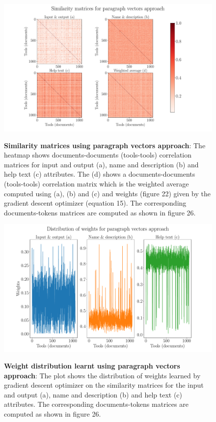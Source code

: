 \begin{figure}[h]
\begin{centering}    
    {\includegraphics[scale=0.35]{figures/Similarity_matrices_doc2vec.pdf}}
    \caption[Similarity matrices using paragraph vectors approach]{\textbf{Similarity matrices using paragraph vectors approach}: The heatmap shows documents-documents (tools-tools) correlation matrices for input and output (a), name and description (b) and help text (c) attributes. The (d) shows a documents-documents (tools-tools) correlation matrix which is the weighted average computed using (a), (b) and (c) and weights (figure 22) given by the gradient descent optimizer (equation 15). The corresponding documents-tokens matrices are computed as shown in figure 26.}
\end{centering}
\end{figure}

\begin{figure}[h]
\begin{centering}
    {\includegraphics[scale=0.35]{figures/Weights_doc2vec.pdf}}
    \caption[Weights distribution for doc2vec]{\textbf{Weight distribution learnt using paragraph vectors approach}: The plot shows the distribution of weights learned by gradient descent optimizer on the similarity matrices for the input and output (a), name and description (b) and help text (c) attributes. The corresponding documents-tokens matrices are computed as shown in figure 26. }
\end{centering}
\end{figure}


